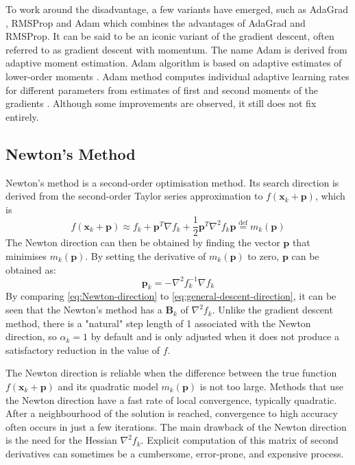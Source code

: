 To work around the disadvantage, a few variants have emerged, such as AdaGrad \cite{Duchi2011}, RMSProp \cite{Tieleman2012} and Adam \cite{Kingma2015} which combines the advantages of AdaGrad and RMSProp. It can be said to be an iconic variant of the gradient descent, often referred to as gradient descent with momentum. The name Adam is derived from adaptive moment estimation. Adam algorithm is based on adaptive estimates of lower-order moments \cite{Kingma2015}. Adam method computes individual adaptive learning rates for different parameters from estimates of first and second moments of the gradients \cite{Kingma2015}. Although some improvements are observed, it still does not fix entirely.


\subsection{Newton's Method}
Newton's method is a second-order optimisation method. Its search direction is derived from the second-order Taylor series approximation to $f(\textbf{x}_k+\textbf{p})$, which is
\begin{equation}
  f(\textbf{x}_k+\textbf{p}) \approx f_k + \textbf{p}^T \nabla f_k + \frac{1}{2}\textbf{p}^T \nabla^2 f_k \textbf{p} \stackrel{\text{def}}{=}m_k(\textbf{p})
\end{equation}
The Newton direction can then be obtained by finding the vector $\textbf{p}$ that minimises $m_k(\textbf{p})$. By setting the derivative of $m_k(\textbf{p})$ to zero, $\textbf{p}$ can be obtained as:
\begin{equation}
  \textbf{p}_k=-\nabla^2 f_k^{-1}\nabla f_k \label{eq:Newton-direction}
\end{equation}
By comparing \cref{eq:Newton-direction} to \cref{eq:general-descent-direction}, it can be seen that the Newton's method has a $\textbf{B}_k$ of $\nabla^2 f_k$. Unlike the gradient descent method, there is a "natural" step length of 1 associated with the Newton direction, so $\alpha_k = 1$ by default and is only adjusted when it does not produce a satisfactory reduction in the value of $f$.

The Newton direction is reliable when the difference between the true function $f(\textbf{x}_k+\textbf{p})$ and its quadratic model $m_k(\textbf{p})$ is not too large. Methods that use the Newton direction have a fast rate of local convergence, typically quadratic. After a neighbourhood of the solution is reached, convergence to high accuracy often occurs in just a few iterations. The main drawback of the Newton direction is the need for the Hessian $\nabla^2 f_k$. Explicit computation of this matrix of second derivatives can sometimes be a cumbersome, error-prone, and expensive process. \cite{Nocedal2006}



